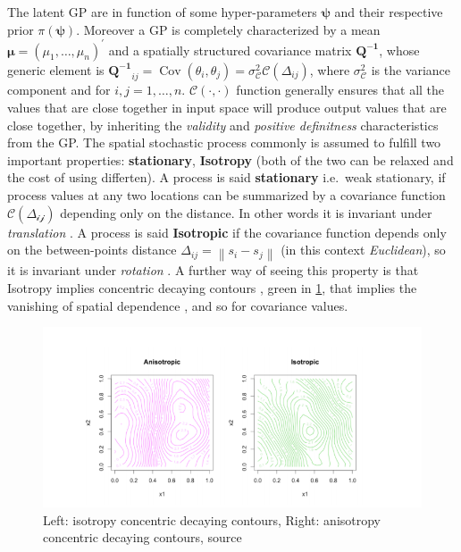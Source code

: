 \documentclass[
  12pt,
  a4paper,
  oneside]{book}
\theoremstyle{definition}
\theoremstyle{definition}
\theoremstyle{definition}
\theoremstyle{remark}
\begin{document}
The latent GP are in function of some hyper-parameters \(\boldsymbol\psi\) and their respective prior \(\pi(\boldsymbol\psi)\). Moreover a GP is completely characterized by a mean \(\boldsymbol{\mu}=\left(\mu_{1}, \ldots, \mu_{n}\right)^{\prime}\) and a spatially structured covariance matrix \(\boldsymbol{Q^{-1}}\), whose generic element is \(\boldsymbol{Q^{-1}}_{i j}=\operatorname{Cov}(\theta_{i}, \theta_{j})=\sigma^2_{\mathscr{C}} \mathscr{C}(\Delta_{i j})\), where \(\sigma_{\mathscr{C}}^{2}\) is the variance component and for \(i, j = 1, \ldots, n\). \(\mathscr{C}\left( \cdot, \cdot \right)\) function generally ensures that all the values that are close together in input space will produce output values that are close together, by inheriting the \emph{validity} and \emph{positive definitness} characteristics from the GP. The spatial stochastic process commonly is assumed to fulfill two important properties: \textbf{stationary}, \textbf{Isotropy} (both of the two can be relaxed and the cost of using differten).
A process is said \textbf{stationary} i.e.~weak stationary, if process values at any two locations can be summarized by a covariance function \(\mathscr{C(\Delta_{i j})}\) depending only on the distance. In other words it is invariant under \emph{translation} \citep{Krainski-Rubio}.
A process is said \textbf{Isotropic} if the covariance function depends only on the between-points distance \(\Delta_{i j}=\left\|s_{i}-s_{j}\right\|\) (in this context \emph{Euclidean}), so it is invariant under \emph{rotation} \citeyearpar{Krainski-Rubio}. A further way of seeing this property is that Isotropy implies concentric decaying contours \citep{LecturePaci}, green in \ref{fig:isoovsanis}, that implies the vanishing of spatial dependence \citep{Blangiardo-Cameletti}, and so for covariance values.

\begin{figure}
\centering
\includegraphics{images/isotropyVSanisotropy.png}
\caption{\label{fig:isoovsanis}Left: isotropy concentric decaying contours, Right: anisotropy concentric decaying contours, source \citet{blanchetscalliet}}
\end{figure}
\end{document}
